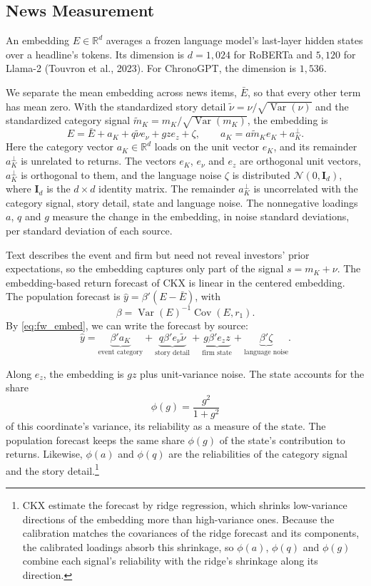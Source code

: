 \documentclass[11pt,letterpaper]{article}
\let\oldsubsection\subsection
\renewcommand{\subsection}{\FloatBarrier\oldsubsection}
\theoremstyle{remark}
\DeclareMathOperator{\Var}{Var}
\DeclareMathOperator{\Cov}{Cov}
\begin{document}
\subsection{News Measurement}

An embedding $E\in\mathbb R^d$ averages a frozen language model's last-layer hidden states over a headline's tokens. Its dimension is $d=1{,}024$ for RoBERTa and $5{,}120$ for Llama-2 (Touvron et al., 2023).
For ChronoGPT, the dimension is $1{,}536$.

We separate the mean embedding across news items, $\bar E$, so that every other term has mean zero. With the standardized story detail $\tilde\nu=\nu/\sqrt{\Var(\nu)}$ and the standardized category signal $\tilde m_K=m_K/\sqrt{\Var(m_K)}$, the embedding is
\begin{equation}\label{eq:fw_embed}
E=\bar E+a_K+q\tilde\nu e_\nu+gz e_z+\zeta,
\qquad
a_K=a\tilde m_K e_K+a_K^\perp.
\end{equation}
Here the category vector $a_K\in\mathbb R^d$ loads on the unit vector $e_K$, and its remainder $a_K^\perp$ is unrelated to returns. The vectors $e_K$, $e_\nu$ and $e_z$ are orthogonal unit vectors, $a_K^\perp$ is orthogonal to them, and the language noise $\zeta$ is distributed $\mathcal N(0,\mathbf I_d)$, where $\mathbf I_d$ is the $d\times d$ identity matrix. The remainder $a_K^\perp$ is uncorrelated with the category signal, story detail, state and language noise. The nonnegative loadings $a$, $q$ and $g$ measure the change in the embedding, in noise standard deviations, per standard deviation of each source.

Text describes the event and firm but need not reveal investors' prior expectations, so the embedding captures only part of the signal $s=m_K+\nu$. The embedding-based return forecast of CKX is linear in the centered embedding. The population forecast is $\hat y=\beta'(E-\bar E)$, with
\[
\beta=\Var(E)^{-1}\Cov(E,r_1).
\]
By \eqref{eq:fw_embed}, we can write the forecast by source:
\[
\hat y
=
\underbrace{\beta'a_K}_{\text{event category}}
+
\underbrace{q\beta'e_\nu\tilde\nu}_{\text{story detail}}
+
\underbrace{g\beta'e_z z}_{\text{firm state}}
+
\underbrace{\beta'\zeta}_{\text{language noise}}.
\]

Along $e_z$, the embedding is $gz$ plus unit-variance noise. The state accounts for the share
\[
\phi(g)=\frac{g^2}{1+g^2}
\]
of this coordinate's variance, its reliability as a measure of the state. The population forecast keeps the same share $\phi(g)$ of the state's contribution to returns. Likewise, $\phi(a)$ and $\phi(q)$ are the reliabilities of the category signal and the story detail.\footnote{CKX estimate the forecast by ridge regression, which shrinks low-variance directions of the embedding more than high-variance ones. Because the calibration matches the covariances of the ridge forecast and its components, the calibrated loadings absorb this shrinkage, so $\phi(a)$, $\phi(q)$ and $\phi(g)$ combine each signal's reliability with the ridge's shrinkage along its direction.}
\end{document}
